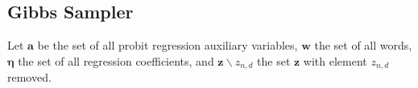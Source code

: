%
%

\subsection{Gibbs Sampler}
 Let $\mathbf{a}$ be the set of all probit regression auxiliary variables, $\mathbf{w}$  the set of all words, $\boldsymbol\eta$  the set of all regression coefficients, and  $\mathbf{z}\backslash z_{n,d}$  the set $\mathbf{z}$ with element $z_{n,d}$ removed.  %




